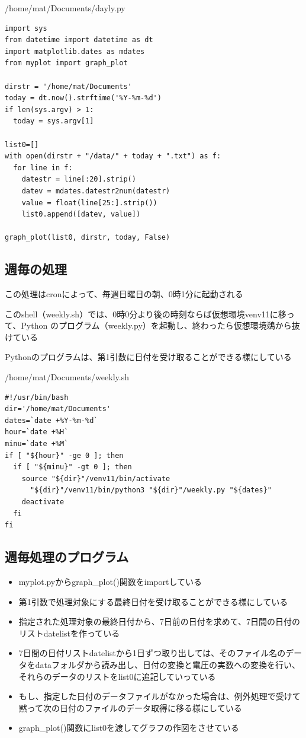 \documentclass[12pt,a4paper,uplatex]{jsarticle}
\begin{document}
\begin{itembox}[l]{/home/mat/Documents/dayly.py}
	\begin{verbatim}
import sys
from datetime import datetime as dt
import matplotlib.dates as mdates
from myplot import graph_plot

dirstr = '/home/mat/Documents'
today = dt.now().strftime('%Y-%m-%d')
if len(sys.argv) > 1:
  today = sys.argv[1]

list0=[]
with open(dirstr + "/data/" + today + ".txt") as f:
  for line in f:
    datestr = line[:20].strip()
    datev = mdates.datestr2num(datestr)
    value = float(line[25:].strip())
    list0.append([datev, value])

graph_plot(list0, dirstr, today, False)
	\end{verbatim}
\end{itembox}

\subsection{週毎の処理}

この処理はcronによって、毎週日曜日の朝、0時1分に起動される

このshell（weekly.sh）では、0時0分より後の時刻ならば仮想環境venv11に移って、Python のプログラム（weekly.py）を起動し、終わったら仮想環境鵜から抜けている

Pythonのプログラムは、第1引数に日付を受け取ることができる様にしている

\begin{itembox}[l]{/home/mat/Documents/weekly.sh}
	\begin{verbatim}
#!/usr/bin/bash
dir='/home/mat/Documents'
dates=`date +%Y-%m-%d`
hour=`date +%H`
minu=`date +%M`
if [ "${hour}" -ge 0 ]; then
  if [ "${minu}" -gt 0 ]; then
    source "${dir}"/venv11/bin/activate
      "${dir}"/venv11/bin/python3 "${dir}"/weekly.py "${dates}"
    deactivate
  fi
fi
	\end{verbatim}
\end{itembox}

\subsection{週毎処理のプログラム}

\begin{itemize}
	\item myplot.pyからgraph\_plot()関数をimportしている
	\item 第1引数で処理対象にする最終日付を受け取ることができる様にしている
	\item 指定された処理対象の最終日付から、7日前の日付を求めて、7日間の日付のリストdatelistを作っている
	\item 7日間の日付リストdatelistから1日ずつ取り出しては、そのファイル名のデータをdataフォルダから読み出し、日付の変換と電圧の実数への変換を行い、それらのデータのリストをlist0に追記していっている
	\item もし、指定した日付のデータファイルがなかった場合は、例外処理で受けて黙って次の日付のファイルのデータ取得に移る様にしている
	\item graph\_plot()関数にlist0を渡してグラフの作図をさせている
\end{itemize}
\end{document}
